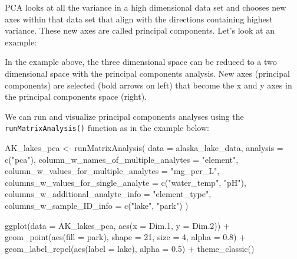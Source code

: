 \documentclass[
]{krantz}
\newenvironment{Shaded}{\begin{snugshade}}{\end{snugshade}}
\newcommand{\AttributeTok}[1]{\textcolor[rgb]{0.77,0.63,0.00}{#1}}
\newcommand{\DecValTok}[1]{\textcolor[rgb]{0.00,0.00,0.81}{#1}}
\newcommand{\FloatTok}[1]{\textcolor[rgb]{0.00,0.00,0.81}{#1}}
\newcommand{\FunctionTok}[1]{\textcolor[rgb]{0.00,0.00,0.00}{#1}}
\newcommand{\NormalTok}[1]{#1}
\newcommand{\OtherTok}[1]{\textcolor[rgb]{0.56,0.35,0.01}{#1}}
\newcommand{\SpecialCharTok}[1]{\textcolor[rgb]{0.00,0.00,0.00}{#1}}
\newcommand{\StringTok}[1]{\textcolor[rgb]{0.31,0.60,0.02}{#1}}
\begin{document}
PCA looks at all the variance in a high dimensional data set and chooses new axes within that data set that align with the directions containing highest variance. These new axes are called principal components. Let's look at an example:

In the example above, the three dimensional space can be reduced to a two dimensional space with the principal components analysis. New axes (principal components) are selected (bold arrows on left) that become the x and y axes in the principal components space (right).

We can run and visualize principal components analyses using the \texttt{runMatrixAnalysis()} function as in the example below:

\begin{Shaded}
\begin{Highlighting}[]
\NormalTok{AK\_lakes\_pca }\OtherTok{\textless{}{-}} \FunctionTok{runMatrixAnalysis}\NormalTok{(}
  \AttributeTok{data =}\NormalTok{ alaska\_lake\_data,}
  \AttributeTok{analysis =} \FunctionTok{c}\NormalTok{(}\StringTok{"pca"}\NormalTok{),}
  \AttributeTok{column\_w\_names\_of\_multiple\_analytes =} \StringTok{"element"}\NormalTok{,}
  \AttributeTok{column\_w\_values\_for\_multiple\_analytes =} \StringTok{"mg\_per\_L"}\NormalTok{,}
  \AttributeTok{columns\_w\_values\_for\_single\_analyte =} \FunctionTok{c}\NormalTok{(}\StringTok{"water\_temp"}\NormalTok{, }\StringTok{"pH"}\NormalTok{),}
  \AttributeTok{columns\_w\_additional\_analyte\_info =} \StringTok{"element\_type"}\NormalTok{,}
  \AttributeTok{columns\_w\_sample\_ID\_info =} \FunctionTok{c}\NormalTok{(}\StringTok{"lake"}\NormalTok{, }\StringTok{"park"}\NormalTok{)}
\NormalTok{)}

\FunctionTok{ggplot}\NormalTok{(}\AttributeTok{data =}\NormalTok{ AK\_lakes\_pca, }\FunctionTok{aes}\NormalTok{(}\AttributeTok{x =}\NormalTok{ Dim}\FloatTok{.1}\NormalTok{, }\AttributeTok{y =}\NormalTok{ Dim}\FloatTok{.2}\NormalTok{)) }\SpecialCharTok{+}
  \FunctionTok{geom\_point}\NormalTok{(}\FunctionTok{aes}\NormalTok{(}\AttributeTok{fill =}\NormalTok{ park), }\AttributeTok{shape =} \DecValTok{21}\NormalTok{, }\AttributeTok{size =} \DecValTok{4}\NormalTok{, }\AttributeTok{alpha =} \FloatTok{0.8}\NormalTok{) }\SpecialCharTok{+}
  \FunctionTok{geom\_label\_repel}\NormalTok{(}\FunctionTok{aes}\NormalTok{(}\AttributeTok{label =}\NormalTok{ lake), }\AttributeTok{alpha =} \FloatTok{0.5}\NormalTok{) }\SpecialCharTok{+}
  \FunctionTok{theme\_classic}\NormalTok{()}
\end{Highlighting}
\end{Shaded}
\end{document}
